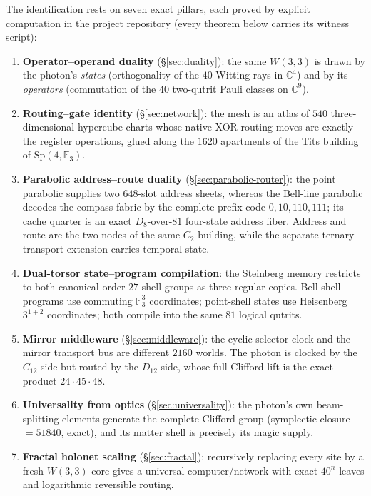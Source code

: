 \documentclass[11pt]{article}
\newcommand{\W}{W(3,3)}
\newcommand{\GF}[1]{\mathbb{F}_{#1}}
\newcommand{\Sp}{\mathrm{Sp}}
\begin{document}
The identification rests on seven exact pillars, each proved by
explicit computation in the project repository (every theorem below
carries its witness script):

\begin{enumerate}
\item \textbf{Operator--operand duality} (\S\ref{sec:duality}): the
  same $\W$ is drawn by the photon's \emph{states} (orthogonality of
  the $40$ Witting rays in $\mathbb{C}^4$) and by its \emph{operators}
  (commutation of the $40$ two-qutrit Pauli classes on
  $\mathbb{C}^9$).
\item \textbf{Routing--gate identity} (\S\ref{sec:network}): the mesh
  is an atlas of $540$ three-dimensional hypercube charts whose native
  XOR routing moves are exactly the register operations, glued along
  the $1620$ apartments of the Tits building of $\Sp(4,\GF3)$.
\item \textbf{Parabolic address--route duality}
  (\S\ref{sec:parabolic-router}): the point parabolic supplies two
  $648$-slot address sheets, whereas the Bell-line parabolic decodes
  the compass fabric by the complete prefix code $0,10,110,111$; its
  cache quarter is an exact $D_8$-over-$81$ four-state address fiber.
  Address and route are the two nodes of the same $C_2$ building, while
  the separate ternary transport extension carries temporal state.
\item \textbf{Dual-torsor state--program compilation}: the Steinberg
  memory restricts to both canonical order-$27$ shell groups as three
  regular copies.  Bell-shell programs use commuting $\GF3^3$
  coordinates; point-shell states use Heisenberg $3^{1+2}$
  coordinates; both compile into the same $81$ logical qutrits.
\item \textbf{Mirror middleware} (\S\ref{sec:middleware}): the cyclic
  selector clock and the mirror transport bus are different $2160$
  worlds.  The photon is clocked by the $C_{12}$ side but routed by the
  $D_{12}$ side, whose full Clifford lift is the exact product
  $24\cdot45\cdot48$.
\item \textbf{Universality from optics} (\S\ref{sec:universality}):
  the photon's own beam-splitting elements generate the complete
  Clifford group (symplectic closure $=51840$, exact), and its matter
  shell is precisely its magic supply.
\item \textbf{Fractal holonet scaling} (\S\ref{sec:fractal}):
  recursively replacing every site by a fresh $\W$ core gives a
  universal computer/network with exact $40^n$ leaves and
  logarithmic reversible routing.
\end{enumerate}
\end{document}

